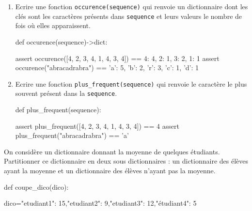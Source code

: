 \begin{exercice_cours}{\quad}{}

			\begin{enumerate}
				\item  Ecrire une fonction \verb|occurence(sequence)| qui renvoie un dictionnaire dont les clés sont les caractères présents dans \verb|sequence| et leurs valeurs le nombre de fois où elles apparaissent.

				\begin{CodePythontexAlt}[TaillePolice=\normalsize, Largeur=1\linewidth,Centre,Lignes=false,PremLigne=1]{}
					def occurence(sequence)->dict:
						  









					assert occurence([4, 2, 3, 4, 1, 4, 3, 4]) == {4: 4, 2: 1, 3: 2, 1: 1}
					assert occurence("abracadrabra") == {'a': 5, 'b': 2, 'r': 3, 'c': 1, 'd': 1}
				\end{CodePythontexAlt}

				\item Ecrire une fonction \verb|plus_frequent(sequence)| qui renvoie le caractère le plus souvent présent dans la \verb|sequence|.
				
				\begin{CodePythontexAlt}[TaillePolice=\normalsize, Largeur=1\linewidth,Centre,Lignes=false,PremLigne=1]{}
					def plus_frequent(sequence):
						



					





					assert plus_frequent([4, 2, 3, 4, 1, 4, 3, 4]) == 4
					assert plus_frequent("abracadrabra") == 'a'
				\end{CodePythontexAlt}

			\end{enumerate}


\end{exercice_cours}

	

\begin{exercice_cours}{\quad}{}

	On considère un dictionnaire donnant la moyenne de quelques étudiants. Partitionner ce dictionnaire en deux sous dictionnaires : un dictionnaire
	des élèves ayant la moyenne et un dictionnaire des élèves n'ayant pas la
	moyenne.
	

	\begin{CodePythontexAlt}[TaillePolice=\normalsize, Largeur=1\linewidth,Centre,PremLigne=1, Lignes=false,]{}
		def coupe_dico(dico):
			








		dico={"etudiant1": 15,"etudiant2": 9,"etudiant3": 12,"étudiant4": 5}
	\end{CodePythontexAlt}
\end{exercice_cours}

